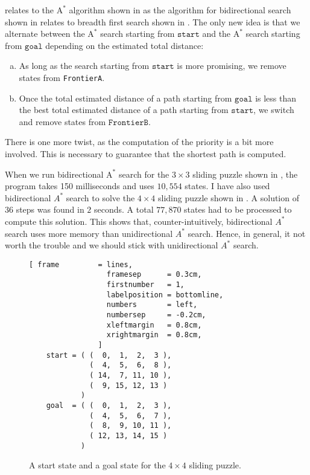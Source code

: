 relates to the $\mathrm{A}^*$ algorithm shown in  as the algorithm for bidirectional
search shown in  relates to breadth first search shown in .
The only new idea is that we alternate between the $\mathrm{A}^*$ search starting from $\texttt{start}$ and the
$\mathrm{A}^*$ search starting from $\texttt{goal}$ depending on the estimated total distance:
\begin{enumerate}[(a)]
\item As long as the search starting from $\texttt{start}$ is more promising, we remove states from
      \texttt{FrontierA}.
\item Once the total estimated distance of a path starting from $\texttt{goal}$ is less than the best total
      estimated distance of a path starting from $\texttt{start}$, we switch and remove states from $\texttt{FrontierB}$.
\end{enumerate}
There is one more twist, as the computation of the priority is a bit more involved.  This is necessary to
guarantee that the shortest path is computed.
    
When we run bidirectional $\mathrm{A}^*$ search for the $3 \times 3$ sliding puzzle shown in
, the program takes 150 milliseconds and uses $10,554$ states.  I have also
used bidirectional $A^*$ search to solve the $4 \times 4$ sliding puzzle shown in .  A
solution of $36$ steps was found in $2$ seconds. 
A total $77,870$ states had to be processed to compute this solution.
This shows that, counter-intuitively, bidirectional $A^*$ search uses more memory than unidirectional $A^*$
search.  Hence, in general, it not worth the trouble and we should stick with unidirectional $A^*$ search.




\begin{figure}[!ht]
\centering
\begin{Verbatim}[ frame         = lines,
                  framesep      = 0.3cm,
                  firstnumber   = 1,
                  labelposition = bottomline,
                  numbers       = left,
                  numbersep     = -0.2cm,
                  xleftmargin   = 0.8cm,
                  xrightmargin  = 0.8cm,
                ]
    start = ( (  0,  1,  2,  3 ),
              (  4,  5,  6,  8 ),
              ( 14,  7, 11, 10 ),
              (  9, 15, 12, 13 )
            )
    goal  = ( (  0,  1,  2,  3 ),
              (  4,  5,  6,  7 ),
              (  8,  9, 10, 11 ),
              ( 12, 13, 14, 15 )
            )
\end{Verbatim}
\vspace*{-0.3cm}
\caption{A start state and a goal state for the $4 \times 4$ sliding puzzle.}
\label{fig:start-goal.stlx}
\end{figure}
\pagebreak


